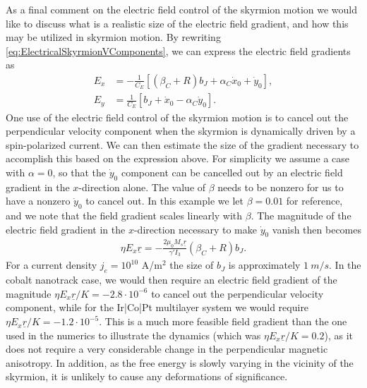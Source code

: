 As a final comment on the electric field control of the skyrmion motion we would like to discuss what is a realistic size of the electric field gradient, and how this may be utilized in skyrmion motion. By rewriting \eqref{eq:ElectricalSkyrmionVComponents}, we can express the electric field gradients as
\begin{subequations}
\begin{align}
    E_x &= -\frac{1}{C_E}\left[\left(\beta_C+R\right)b_J + \alpha_C\dot{x}_0+\dot{y}_0\right], \\
    E_y &= \frac{1}{C_E}\left[b_J+\dot{x}_0-\alpha_C\dot{y}_0\right].
\end{align}
\end{subequations}
One use of the electric field control of the skyrmion motion is to cancel out the perpendicular velocity component when the skyrmion is dynamically driven by a spin-polarized current. We can then estimate the size of the gradient necessary to accomplish this based on the expression above. For simplicity we assume a case with $\alpha=0$, so that the $\dot{y}_0$ component can be cancelled out by an electric field gradient in the $x$-direction alone. The value of $\beta$ needs to be nonzero for us to have a nonzero $\dot{y}_0$ to cancel out. In this example we let $\beta=0.01$ for reference, and we note that the field gradient scales linearly with $\beta$. The magnitude of the electric field gradient in the $x$-direction necessary to make $\dot{y}_0$ vanish then becomes
\begin{align}
    \eta E_x\underline{r} = -\frac{2\mu_0M_s\underline{r}}{\gamma' I_3}\left(\beta_C+R\right)b_J.
\end{align}
For a current density $j_e = 10^{10}$ A/m$^2$ the size of $b_J$ is approximately $\SI{1}{m/s}$. In the cobalt nanotrack case, we would then require an electric field gradient of the magnitude $\eta E_x\underline{r}/K = -2.8\cdot10^{-6}$ to cancel out the perpendicular velocity component, while for the Ir|Co|Pt multilayer system we would require $\eta E_x\underline{r}/K = -1.2\cdot10^{-5}$. This is a much more feasible field gradient than the one used in the numerics to illustrate the dynamics (which was $\eta E_x\underline{r}/K = 0.2$), as it does not require a very considerable change in the perpendicular magnetic anisotropy. In addition, as the free energy is slowly varying in the vicinity of the skyrmion, it is unlikely to cause any deformations of significance. 